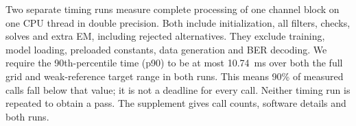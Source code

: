 Two separate timing runs measure complete processing of one channel block on one CPU thread in double precision. Both include initialization, all filters, checks, solves and extra EM, including rejected alternatives. They exclude training, model loading, preloaded constants, data generation and BER decoding. We require the 90th-percentile time (p90) to be at most 10.74~ms over both the full grid and weak-reference target range in both runs. This means 90\% of measured calls fall below that value; it is not a deadline for every call. Neither timing run is repeated to obtain a pass. The supplement gives call counts, software details and both runs.
